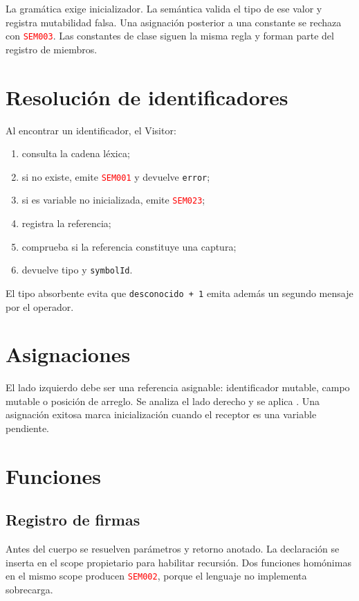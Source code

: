 \documentclass[11pt,letterpaper,oneside]{report}
\newcommand{\archivo}[1]{\path{#1}}
\newcommand{\codigo}[1]{\texttt{#1}}
\newcommand{\diag}[1]{\textcolor{red}{\texttt{#1}}}
\begin{document}
La gramática exige inicializador. La semántica valida el tipo de ese valor y registra
mutabilidad falsa. Una asignación posterior a una constante se rechaza con
\diag{SEM003}. Las constantes de clase siguen la misma regla y forman parte del
registro de miembros.

\section{Resolución de identificadores}

Al encontrar un identificador, el Visitor:

\begin{enumerate}
  \item consulta la cadena léxica;
  \item si no existe, emite \diag{SEM001} y devuelve \codigo{error};
  \item si es variable no inicializada, emite \diag{SEM023};
  \item registra la referencia;
  \item comprueba si la referencia constituye una captura;
  \item devuelve tipo y \codigo{symbolId}.
\end{enumerate}

El tipo absorbente evita que \codigo{desconocido + 1} emita además un segundo mensaje
por el operador.

\section{Asignaciones}

El lado izquierdo debe ser una referencia asignable: identificador mutable, campo
mutable o posición de arreglo. Se analiza el lado derecho y se aplica
\archivo{isAssignable}. Una asignación exitosa marca inicialización cuando el receptor
es una variable pendiente.

\section{Funciones}

\subsection{Registro de firmas}

Antes del cuerpo se resuelven parámetros y retorno anotado. La declaración se inserta
en el scope propietario para habilitar recursión. Dos funciones homónimas en el mismo
scope producen \diag{SEM002}, porque el lenguaje no implementa sobrecarga.
\end{document}
